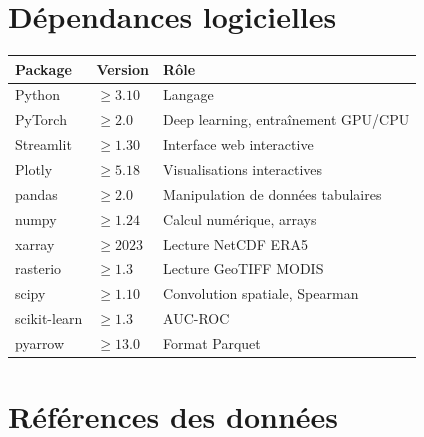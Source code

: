 \documentclass[12pt,a4paper]{report}
\begin{document}
\chapter{Dépendances logicielles}

\begin{center}
\begin{tabular}{lll}
\toprule
\rowcolor{fireOrange!15}
\textbf{Package} & \textbf{Version} & \textbf{Rôle} \\
\midrule
Python        & $\geq 3.10$  & Langage \\
PyTorch       & $\geq 2.0$   & Deep learning, entraînement GPU/CPU \\
Streamlit     & $\geq 1.30$  & Interface web interactive \\
Plotly        & $\geq 5.18$  & Visualisations interactives \\
pandas        & $\geq 2.0$   & Manipulation de données tabulaires \\
numpy         & $\geq 1.24$  & Calcul numérique, arrays \\
xarray        & $\geq 2023$  & Lecture NetCDF ERA5 \\
rasterio      & $\geq 1.3$   & Lecture GeoTIFF MODIS \\
scipy         & $\geq 1.10$  & Convolution spatiale, Spearman \\
scikit-learn  & $\geq 1.3$   & AUC-ROC \\
pyarrow       & $\geq 13.0$  & Format Parquet \\
\bottomrule
\end{tabular}
\end{center}

\chapter{Références des données}
\end{document}
